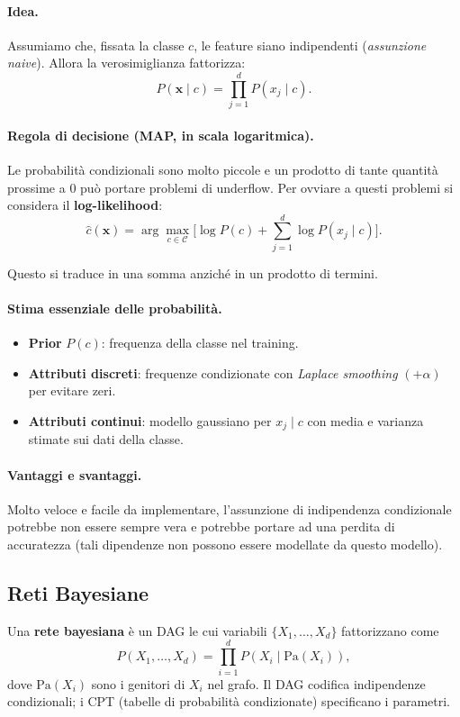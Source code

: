 \paragraph{Idea.}
Assumiamo che, fissata la classe \(c\), le feature siano indipendenti (\emph{assunzione naive}). Allora la verosimiglianza fattorizza:
\[
P(\mathbf{x}\mid c)=\prod_{j=1}^{d} P(x_j\mid c).
\]

\paragraph{Regola di decisione (MAP, in scala logaritmica).} Le probabilità condizionali sono molto piccole e un prodotto di tante quantità prossime a 0 può portare problemi di underflow. Per ovviare a questi problemi si considera il \textbf{log-likelihood}:
\[
\hat{c}(\mathbf{x})=\arg\max_{c\in\mathcal{C}}
\Big[\log P(c)+\sum_{j=1}^{d}\log P(x_j\mid c)\Big].
\]

\noindent
Questo si traduce in una somma anziché in un prodotto di termini.

\paragraph{Stima essenziale delle probabilità.}
\begin{itemize}
  \item \textbf{Prior} \(P(c)\): frequenza della classe nel training.
  \item \textbf{Attributi discreti}: frequenze condizionate con \emph{Laplace smoothing} \((+\alpha)\) per evitare zeri.
  \item \textbf{Attributi continui}: modello gaussiano per \(x_j\mid c\) con media e varianza stimate sui dati della classe.
\end{itemize}

\paragraph{Vantaggi e svantaggi.} Molto veloce e facile da implementare, l'assunzione di indipendenza condizionale potrebbe non essere sempre vera e potrebbe portare ad una perdita di accuratezza (tali dipendenze non possono essere modellate da questo modello).

\subsection{Reti Bayesiane}\label{subsec:bayesnet}
Una \textbf{rete bayesiana} è un DAG le cui variabili $\{X_1,\dots,X_d\}$ fattorizzano come
\[
P(X_1,\dots,X_d)=\prod_{i=1}^d P(X_i\mid \mathrm{Pa}(X_i)),
\]
dove $\mathrm{Pa}(X_i)$ sono i genitori di $X_i$ nel grafo. Il DAG codifica indipendenze condizionali; i CPT (tabelle di probabilità condizionate) specificano i parametri.

